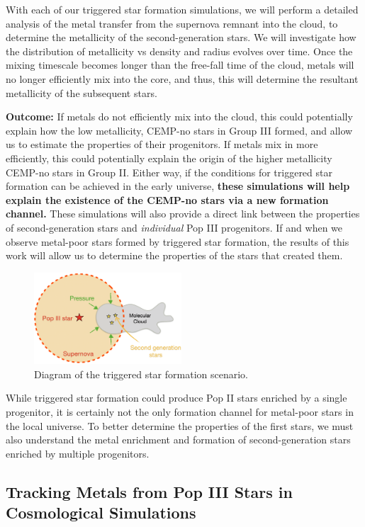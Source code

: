 \documentclass[a4paper, 12pt]{article}
\begin{document}
With each of our triggered star formation simulations, we will perform a detailed analysis of the metal transfer from the supernova remnant into the cloud, to determine the metallicity of the second-generation stars. We will investigate how the distribution of metallicity vs density and radius evolves over time. Once the mixing timescale becomes longer than the free-fall time of the cloud, metals will no longer efficiently mix into the core, and thus, this will determine the resultant metallicity of the subsequent stars. 

\textbf{Outcome:} If metals do not efficiently mix into the cloud, this could potentially explain how the low metallicity, CEMP-no stars in Group III formed, and allow us to estimate the properties of their progenitors. If metals mix in more efficiently, this could potentially explain the origin of the higher metallicity CEMP-no stars in Group II. Either way, if the conditions for triggered star formation can be achieved in the early universe, \textbf{these simulations will help explain the existence of the CEMP-no stars via a new formation channel.} These simulations will also provide a direct link between the properties of second-generation stars and \textit{individual} Pop III progenitors. If and when we observe metal-poor stars formed by triggered star formation, the results of this work will allow us to determine the properties of the stars that created them.


\begin{figure}
  \includegraphics[width=0.49\textwidth]{figures/tsf2}
  \caption{Diagram of the triggered star formation scenario.}
  \label{fig:tsf}
\end{figure}

While triggered star formation could produce Pop II stars enriched by a single progenitor, it is certainly not the only formation channel for metal-poor stars in the local universe. To better determine the properties of the first stars, we must also understand the metal enrichment and formation of second-generation stars enriched by multiple progenitors.

\subsection{Tracking Metals from Pop III Stars in Cosmological Simulations}
\label{subsec:tracer_particles}
\end{document}
